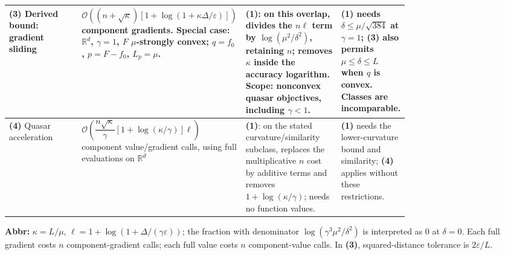 \begin{table}[tp]
\begin{threeparttable}
\begin{tabularx}{\linewidth}{@{}>{\raggedright\arraybackslash}p{0.20\linewidth}>{\raggedright\arraybackslash}p{0.32\linewidth}>{\raggedright\arraybackslash}p{0.25\linewidth}>{\raggedright\arraybackslash}X@{}}
\midrule
\textbf{(3)} Derived bound: gradient sliding \citep[Theorem 3]{sfqKovalev2022v1}
& $\mathcal{O}\!\left((n+\sqrt{\kappa})[1+\log(1+\kappa\Delta/\varepsilon)]\right)$ component gradients. Special case: $\mathbb{R}^d$, $\gamma=1$, $F$ $\mu$-strongly convex; $q=f_0$, $p=F-f_0$, $L_p=\mu$.
& \textbf{(1)}: on this overlap, divides the $n\ell$ term by $\log(\mu^2/\delta^2)$, retaining $n$; removes $\kappa$ inside the accuracy logarithm. Scope: nonconvex quasar objectives, including $\gamma<1$.
& \textbf{(1)} needs $\delta\le\mu/\sqrt{384}$ at $\gamma=1$; \textbf{(3)} also permits $\mu\le\delta\le L$ when $q$ is convex. Classes are incomparable. \\
\midrule
\textbf{(4)} Quasar acceleration \citep[Theorem 1]{csqHinder2020}
& $\mathcal{O}\!\left(\dfrac{n\sqrt{\kappa}}{\gamma}[1+\log(\kappa/\gamma)]\ell\right)$ component value/gradient calls, using full evaluations on $\mathbb{R}^d$
& \textbf{(1)}: on the stated curvature/similarity subclass, replaces the multiplicative $n$ cost by additive terms and removes $1+\log(\kappa/\gamma)$; needs no function values.
& \textbf{(1)} needs the lower-curvature bound and similarity; \textbf{(4)} applies without these restrictions. \\
\bottomrule
\end{tabularx}
\begin{tablenotes}[flushleft]\footnotesize
\item[] \textbf{Abbr:} $\kappa=L/\mu$, $\ell=1+\log(1+\Delta/(\gamma\varepsilon))$; the fraction with denominator $\log(\gamma^3\mu^2/\delta^2)$ is interpreted as $0$ at $\delta=0$. Each full gradient costs $n$ component-gradient calls; each full value costs $n$ component-value calls. In \textbf{(3)}, squared-distance tolerance is $2\varepsilon/L$.
\end{tablenotes}
\end{threeparttable}
\end{table}
\clearpage
